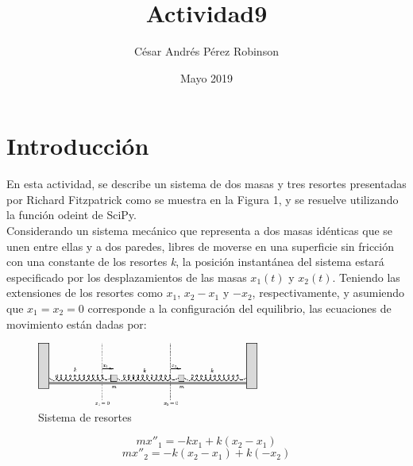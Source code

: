 \documentclass[11pt, spanish]{report}
\title{Actividad9}
\author{César Andrés Pérez Robinson }
\date{Mayo 2019}
\begin{document}
\maketitle

\section{Introducción}
En esta actividad, se describe un sistema de dos masas y tres resortes presentadas por Richard Fitzpatrick como se muestra en la Figura 1, y se resuelve utilizando la función odeint de SciPy.
\\ Considerando un sistema mecánico que representa a dos masas idénticas que se unen entre ellas y a dos paredes, libres de moverse en una superficie sin fricción con una constante de los resortes \textit{k}, la posición instantánea del sistema estará especificado por los desplazamientos de las masas $x_1(t)$ y $x_2(t)$. Teniendo las extensiones de los resortes como $x_1$, $x_2-x_1$ y $-x_2$, respectivamente, y asumiendo que $x_1=x_2=0$ corresponde a la configuración del equilibrio, las ecuaciones de movimiento están dadas por:
\begin{figure}[ht]
\caption{Sistema de resortes}
\centering
\includegraphics[width=0.65\textwidth]{figura1.png}
\end{figure}
\begin{equation}
    mx''_1=-kx_1+k(x_2-x_1)
\end{equation}
\begin{equation}
    mx''_2=-k(x_2-x_1)+k(-x_2)
\end{equation}
\end{document}
